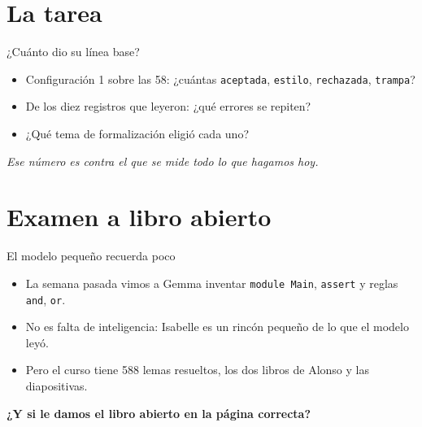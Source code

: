 \documentclass[10pt]{beamer}
\newcommand{\apuesta}[1]{%
  \begin{center}\large\color{resalte}\textbf{#1}\end{center}}
\newcommand{\nota}[1]{{\small\itshape\color{psCom} #1}}
\newcommand{\cd}[1]{\texttt{#1}}
\begin{document}
\section{La tarea}

\begin{frame}{¿Cuánto dio su línea base?}
  \begin{itemize}
    \item Configuración 1 sobre las 58: ¿cuántas \cd{aceptada}, \cd{estilo},
      \cd{rechazada}, \cd{trampa}?
    \item De los diez registros que leyeron: ¿qué errores se repiten?
    \item ¿Qué tema de formalización eligió cada uno?
  \end{itemize}
  \vspace{0.6em}
  \nota{Ese número es contra el que se mide todo lo que hagamos hoy.}
\end{frame}

\section{Examen a libro abierto}

\begin{frame}{El modelo pequeño recuerda poco}
  \begin{itemize}
    \item La semana pasada vimos a Gemma inventar \cd{module Main},
      \cd{assert} y reglas \cd{and}, \cd{or}.
    \item No es falta de inteligencia: Isabelle es un rincón pequeño de lo
      que el modelo leyó.
    \item Pero el curso tiene \alert{588 lemas resueltos}, los dos libros de
      Alonso y las diapositivas.
  \end{itemize}
  \apuesta{¿Y si le damos el libro abierto en la página correcta?}
\end{frame}
\end{document}
